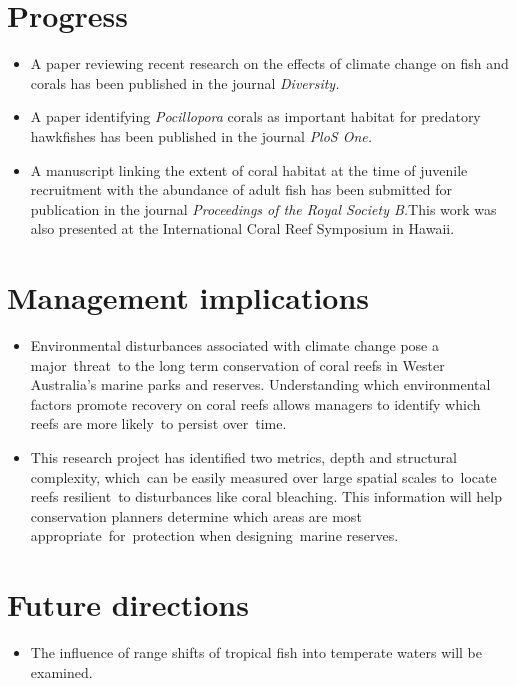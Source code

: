 \documentclass[version=last,
    paper=a4, %
    10pt, %
    usenames,
    dvipsnames,
    oneside, %
    headings=openany, %
    DIV=15 %
]{scrbook}
\begin{document}
\section*{Progress}
\begin{itemize}
\itemsep1pt\parskip0pt
\item
  A paper reviewing recent research on the effects of climate change on
  fish and corals has been published in the journal \emph{Diversity.\\}
\item
  A paper identifying \emph{Pocillopora} corals as important habitat for
  predatory hawkfishes has been published in the journal \emph{PloS
  One.\\}
\item
  A manuscript linking the extent of coral habitat at the time of
  juvenile recruitment with the abundance of adult fish has been
  submitted for publication in the journal \emph{Proceedings of the
  Royal Society B.}This work was also presented at the International
  Coral Reef Symposium in Hawaii.
\end{itemize}



\section*{Management implications}
\begin{itemize}
\itemsep1pt\parskip0pt
\item
  Environmental disturbances associated with climate change pose a
  major~threat~to the long term conservation of coral reefs in Wester
  Australia's marine parks and reserves. Understanding which
  environmental factors promote recovery on coral reefs allows managers
  to identify which reefs are more likely~to persist over~time.
\item
  This research project has identified two metrics, depth and structural
  complexity, which~can be easily measured over large spatial scales
  to~locate reefs resilient~to disturbances like coral bleaching. This
  information will help conservation planners determine which areas are
  most appropriate~for~protection when designing~marine reserves.
\end{itemize}



\section*{Future directions}
\begin{itemize}
\itemsep1pt\parskip0pt
\item
  The influence of range shifts of tropical fish into temperate waters
  will be examined.
\end{itemize}



\end{document}
